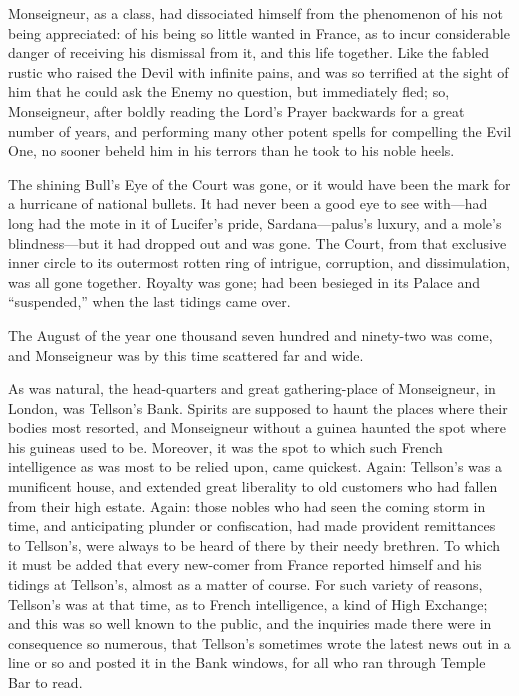 Monseigneur, as a class, had dissociated himself from the phenomenon
of his not being appreciated:  of his being so little wanted in France,
as to incur considerable danger of receiving his dismissal from it,
and this life together.  Like the fabled rustic who raised the Devil
with infinite pains, and was so terrified at the sight of him that he
could ask the Enemy no question, but immediately fled; so, Monseigneur,
after boldly reading the Lord's Prayer backwards for a great number of
years, and performing many other potent spells for compelling the Evil
One, no sooner beheld him in his terrors than he took to his noble heels.

The shining Bull's Eye of the Court was gone, or it would have been
the mark for a hurricane of national bullets.  It had never been a
good eye to see with---had long had the mote in it of Lucifer's pride,
Sardana---palus's luxury, and a mole's blindness---but it had dropped
out and was gone.  The Court, from that exclusive inner circle to its
outermost rotten ring of intrigue, corruption, and dissimulation, was
all gone together.  Royalty was gone; had been besieged in its Palace
and ``suspended,'' when the last tidings came over.

The August of the year one thousand seven hundred and ninety-two was
come, and Monseigneur was by this time scattered far and wide.

As was natural, the head-quarters and great gathering-place of
Monseigneur, in London, was Tellson's Bank.  Spirits are supposed to
haunt the places where their bodies most resorted, and Monseigneur
without a guinea haunted the spot where his guineas used to be.
Moreover, it was the spot to which such French intelligence as was
most to be relied upon, came quickest.  Again:  Tellson's was a
munificent house, and extended great liberality to old customers who
had fallen from their high estate.  Again:  those nobles who had seen
the coming storm in time, and anticipating plunder or confiscation,
had made provident remittances to Tellson's, were always to be heard
of there by their needy brethren.  To which it must be added that every
new-comer from France reported himself and his tidings at Tellson's,
almost as a matter of course.  For such variety of reasons, Tellson's
was at that time, as to French intelligence, a kind of High Exchange;
and this was so well known to the public, and the inquiries made there
were in consequence so numerous, that Tellson's sometimes wrote the
latest news out in a line or so and posted it in the Bank windows,
for all who ran through Temple Bar to read.

